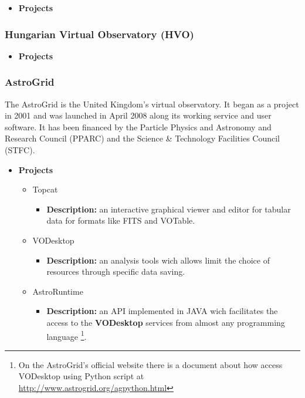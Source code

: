\begin{itemize}
	\item \textbf{Projects}
\end{itemize}

\subsubsection{Hungarian Virtual Observatory (HVO)}
\begin{itemize}
	\item \textbf{Projects}
\end{itemize}

\subsubsection{AstroGrid}
The AstroGrid is the United Kingdom's virtual observatory. It began as a
project in 2001 and was launched in April 2008 along its working service and
user software. It has been financed by the Particle Physics and Astronomy and
Research Council (PPARC) and the Science \& Technology Facilities Council
(STFC).
\begin{itemize}
	\item \textbf{Projects}
	\begin{itemize}
		\item Topcat
			\begin{itemize}
				\item \textbf{Description:} an interactive graphical viewer and
editor for tabular data for formats like FITS and VOTable.
			\end{itemize}
		\item VODesktop
			\begin{itemize}
				\item \textbf{Description:} an analysis tools wich allows limit
the choice of resources through specific data saving.
			\end{itemize}
		\item AstroRuntime
			\begin{itemize}
				\item \textbf{Description:} an API implemented in JAVA wich
facilitates the access to the \textbf{VODesktop} services from almost any
programming language \footnote{On the AstroGrid's official website there is a
document about how access VODesktop using Python script at
\url{http://www.astrogrid.org/agpython.html}}.
			\end{itemize}
	\end{itemize}
\end{itemize}

